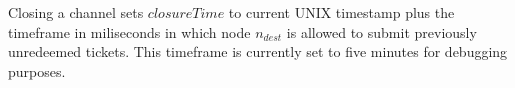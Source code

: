 Closing a channel sets $closureTime$ to current UNIX timestamp plus the timeframe in miliseconds in which node $n_{dest}$ is allowed to submit previously unredeemed tickets. This timeframe is currently set to five minutes for debugging purposes.

\begin{comment}
\paragraph{Opening a channel} Node $A$ can open a channel by transferring funds to the payment channels contract \textit{HoprChannels} and including the following \textit{userdata}:

$$[A: address, B: address, \lambda: uint8, \mu: uint8], \mu = 0,$$

where $\lambda$ is the amount to be staked by $A$. This call will trigger an on-chain event \textit{ChannelFunded} and open a unidirectional payment channel from $A$ to $B$. The payment channel will start in state \textit{Waiting for commitment}. The destination address of the payment channel must now set an on-chain commitment in order for the payment channel between both parties to become \textit{Open}. This is done by $B$ calling the \textit{bumpChannel()} function to make a new set of commitments towards this payment channel. This call will trigger an on-chain event \textit{ChannelOpened} and bumps the ticket epoch to ensure tickets with the previous epochs are invalidated. Every time the channel changes its state, an on-chain event \textit{ChannelUpdated} is emitted.

\paragraph{Redeeming tickets}
As long as the channel remains open, nodes can claim their incentives for forwarding packets via tickets. Tickets are redeemed by dispatching a \textit{redeemTicket()} call to an \textit{Open} payment channel.

If $B$ tries to redeem a ticket from the channel $A\rightarrow B$ (spending channel), but there is an open channel $B\rightarrow A$ (earning channel), $B$'s rewards will be transferred to $B\rightarrow A$ (earning channel). Otherwise, rewards will be sent directly to $B$.

\paragraph{Closing a channel}
Nodes can close a payment channel in order to access their previously staked funds. Only the payment channel creator can initiate the process by calling \textit{initiateChannelClosure()}. This changes the state to $Pending to close$ and triggers a grace period during which the destination node can redeem any unredeemed tickets. Nodes should actively monitor blockchain events to be aware of this payment channel state change.


\end{comment}
